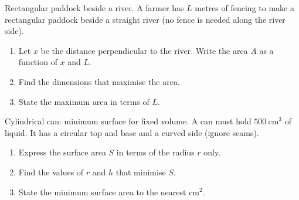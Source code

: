\documentclass[11pt]{article}
\def\textbf#1{#1}%
\newcounter{question}
\begin{document}
\begin{question}
\textbf{Rectangular paddock beside a river.}
A farmer has $L$ metres of fencing to make a rectangular paddock beside a straight river (no fence is needed along the river side).
\begin{enumerate}
  \item Let $x$ be the distance perpendicular to the river. Write the area $A$ as a function of $x$ and $L$.
  \item Find the dimensions that maximise the area.
  \item State the maximum area in terms of $L$.
\end{enumerate}

\begin{center}
\end{center}
\end{question}

\begin{question}
\textbf{Cylindrical can: minimum surface for fixed volume.}
A can must hold $500\ \text{cm}^3$ of liquid. It has a circular top and base and a curved side (ignore seams).
\begin{enumerate}
  \item Express the surface area $S$ in terms of the radius $r$ only.
  \item Find the values of $r$ and $h$ that minimise $S$.
  \item State the minimum surface area to the nearest $\text{cm}^2$.
\end{enumerate}

\begin{center}
\end{center}
\end{question}
\end{document}
